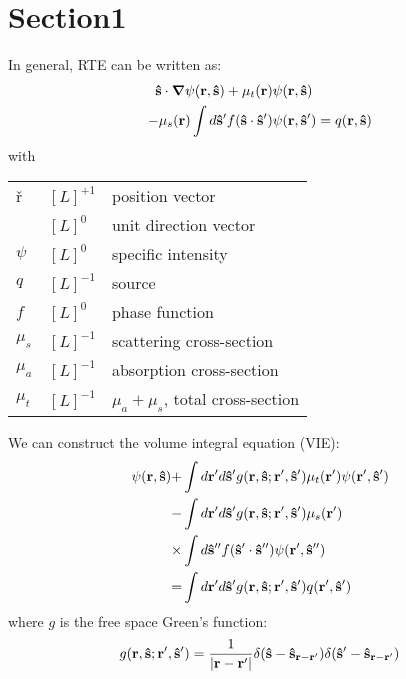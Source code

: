 \documentclass[main]{subfiles}
\begin{document}
\section{Section1}
\label{sec:Section1}

In general, RTE can be written as:
\begin{equation*}
	\begin{split}
		\mathbf{\hat{s}}\cdot\mbox{\boldmath$ \nabla $} \psi(\mathbf{r},\mathbf{\hat{s}})
		+\mu_t(\mathbf{r})&\psi(\mathbf{r},\mathbf{\hat{s}})
		\\
		-\mu_s(\mathbf{r})\int d\mathbf{\hat{s}}^\prime
		f(\mathbf{\hat{s}}\cdot\mathbf{\hat{s}}^{\prime})&\psi(\mathbf{r},\mathbf{\hat{s}}^{\prime})
		=q(\mathbf{r},\mathbf{\hat{s}})
	\end{split}
\end{equation*}
with
\begin{center} \begin{tabular}{lll}
	\v{r}	&	$[L]^{+1}$	& position vector		\\
	\uv{s}	&	$[L]^{0}$	& unit direction vector		\\
	$\psi$	&	$[L]^{0}$	& specific intensity		\\
	$q$	&	$[L]^{-1}$	& source			\\
	$f$	&	$[L]^{0}$	& phase function		\\
	$\mu_s$	&	$[L]^{-1}$	& scattering cross-section	\\
	$\mu_a$	&	$[L]^{-1}$	& absorption cross-section	\\
	$\mu_t$	&	$[L]^{-1}$	& $\mu_a+\mu_s$, total cross-section	\\
\end{tabular} \end{center}

We can construct the volume integral equation (VIE):
\begin{equation} \label{vie}
	\begin{split}
		\psi(\mathbf{r},\mathbf{\hat{s}}) +& \int d\mathbf{r}^{\prime} d\mathbf{\hat{s}}^{\prime}
		g(\mathbf{r},\mathbf{\hat{s}};\mathbf{r}^{\prime},\mathbf{\hat{s}}^{\prime})
		\mu_t(\mathbf{r}^{\prime})\psi(\mathbf{r}^{\prime},\mathbf{\hat{s}}^{\prime})
		\\
		-& \int d\mathbf{r}^{\prime} d\mathbf{\hat{s}}^{\prime} g(\mathbf{r},\mathbf{\hat{s}};\mathbf{r}^{\prime},\mathbf{\hat{s}}^{\prime})
		\mu_s(\mathbf{r}^{\prime}) 
		\\
		\times& \int d\mathbf{\hat{s}}^{{\prime\prime}}
		f(\mathbf{\hat{s}}^{\prime}\cdot\mathbf{\hat{s}}^{{\prime\prime}})\psi(\mathbf{r}^{\prime},\mathbf{\hat{s}}^{{\prime\prime}})
		\\
		=& \int d\mathbf{r}^{\prime} d\mathbf{\hat{s}}^{\prime}
		g(\mathbf{r},\mathbf{\hat{s}};\mathbf{r}^{\prime},\mathbf{\hat{s}}^{\prime})q(\mathbf{r}^{\prime},\mathbf{\hat{s}}^{\prime})
	\end{split}
\end{equation}
where $g$ is the free space Green's function:
\begin{equation} \label{g}
	g(\mathbf{r},\mathbf{\hat{s}};\mathbf{r}^{\prime},\mathbf{\hat{s}}^{\prime}) = \frac{1}{\left| \mathbf{r}-\mathbf{r}^{\prime} \right|} 
	\delta(\mathbf{\hat{s}}-\mathbf{\hat{s}}_{\mathbf{r}-\mathbf{r}^{\prime}})
	\delta(\mathbf{\hat{s}}^{\prime}-\mathbf{\hat{s}}_{\mathbf{r}-\mathbf{r}^{\prime}})
\end{equation}
\end{document}
